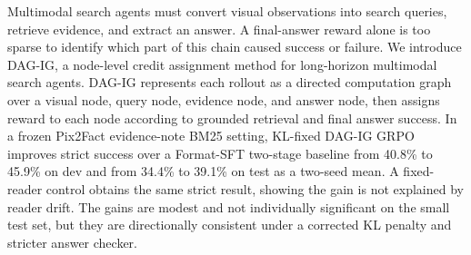 Multimodal search agents must convert visual observations into search queries, retrieve evidence, and extract an answer. A final-answer reward alone is too sparse to identify which part of this chain caused success or failure. We introduce DAG-IG, a node-level credit assignment method for long-horizon multimodal search agents. DAG-IG represents each rollout as a directed computation graph over a visual node, query node, evidence node, and answer node, then assigns reward to each node according to grounded retrieval and final answer success. In a frozen Pix2Fact evidence-note BM25 setting, KL-fixed DAG-IG GRPO improves strict success over a Format-SFT two-stage baseline from 40.8\% to 45.9\% on dev and from 34.4\% to 39.1\% on test as a two-seed mean. A fixed-reader control obtains the same strict result, showing the gain is not explained by reader drift. The gains are modest and not individually significant on the small test set, but they are directionally consistent under a corrected KL penalty and stricter answer checker.
